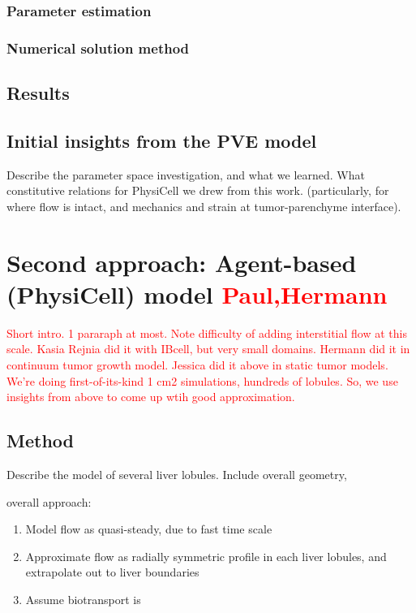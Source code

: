\documentclass[smallextended,natbib]{svjour3}
\newcommand{\red}[1]{\textcolor{red}{#1}}
\begin{document}
\subsubsection{Parameter estimation}
\subsubsection{Numerical solution method}

\subsection{Results}

\subsection{Initial insights from the PVE model}

Describe the parameter space investigation, and what we learned. What constitutive  
relations for PhysiCell we drew from this work. (particularly, for where flow is intact, 
and mechanics and strain at tumor-parenchyme interface). 

\vfill
\pagebreak 

\pagebreak
\section{Second approach: Agent-based (PhysiCell) model \red{Paul,Hermann}}
\label{section:ABM}
\red{Short intro. 1 pararaph at most.  Note difficulty of adding interstitial flow at this scale. 
Kasia Rejnia did it with IBcell, but very small domains. Hermann did it in continuum tumor growth 
model. Jessica did it above in static tumor models. We're doing first-of-its-kind 1 cm2 
simulations, hundreds of lobules. So, we use insights from above to come up wtih good approximation. }

\subsection{Method} 
Describe the model of several liver lobules.  Include overall geometry, 

overall approach:
\begin{enumerate}
\item  
Model flow as quasi-steady, due to fast time scale 
\item 
Approximate flow as radially symmetric profile in each liver lobules, and extrapolate out to liver boundaries
\item 
Assume biotransport is 
\end{enumerate}
\end{document}
